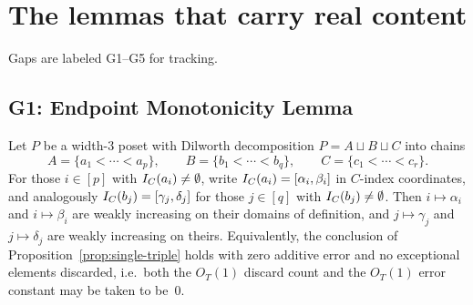 \section{The lemmas that carry real content}

Gaps are labeled G1--G5 for tracking.

\subsection{G1: Endpoint Monotonicity Lemma}\label{subsec:G1}

\begin{lemma}\label{lem:endpoint-mono}
Let $P$ be a width-3 poset with Dilworth decomposition
$P = A \sqcup B \sqcup C$ into chains
\[
A = \{a_1 < \cdots < a_p\},\qquad
B = \{b_1 < \cdots < b_q\},\qquad
C = \{c_1 < \cdots < c_r\}.
\]
For those $i \in [p]$ with $I_C(a_i) \neq \emptyset$, write
$I_C(a_i) = [\alpha_i, \beta_i]$ in $C$-index coordinates, and analogously
$I_C(b_j) = [\gamma_j, \delta_j]$ for those $j \in [q]$ with $I_C(b_j) \neq \emptyset$.
Then $i \mapsto \alpha_i$ and $i \mapsto \beta_i$ are weakly increasing on
their domains of definition, and $j \mapsto \gamma_j$ and $j \mapsto \delta_j$
are weakly increasing on theirs. Equivalently, the conclusion of
Proposition~\ref{prop:single-triple} holds with zero additive error and no
exceptional elements discarded, i.e.\ both the $O_T(1)$ discard count and the
$O_T(1)$ error constant may be taken to be~$0$.
\end{lemma}

